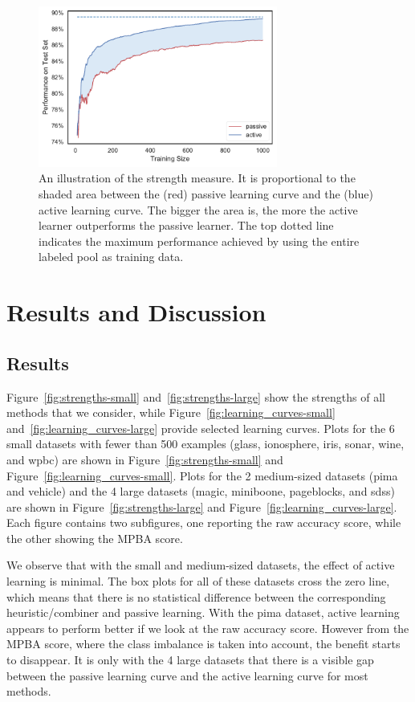\documentclass[fleqn,10pt,lineno]{wlpeerj} %
\begin{document}
\begin{figure}[htbp]
	\centering
	\includegraphics[width=0.7\textwidth]{figures/strength}
	\caption[Strength Measure]{An illustration of the strength measure. It is
	proportional to the shaded area between the (red) passive learning curve
	and the (blue) active learning curve. The bigger the area is, the more the
	active learner outperforms the passive learner. The top dotted line
	indicates the maximum performance achieved by using the entire labeled
	pool as training data.}
	\label{fig:strength}
\end{figure}

\section{Results and Discussion}\label{sec:discuss}

\subsection{Results}

Figure~\ref{fig:strengths-small} and~\ref{fig:strengths-large} show the
strengths of all methods that we consider, while
Figure~\ref{fig:learning_curves-small} and~\ref{fig:learning_curves-large}
provide selected learning curves. Plots for the 6 small datasets with fewer
than 500 examples (glass, ionosphere, iris, sonar, wine, and wpbc) are shown in
Figure~\ref{fig:strengths-small} and Figure~\ref{fig:learning_curves-small}.
Plots for the 2 medium-sized datasets (pima and vehicle) and the 4 large
datasets (magic, miniboone, pageblocks, and sdss) are shown in
Figure~\ref{fig:strengths-large} and Figure~\ref{fig:learning_curves-large}.
Each figure contains two subfigures, one reporting the raw accuracy score,
while the other showing the MPBA score.

We observe that with the small and medium-sized datasets, the effect of active
learning is minimal. The box plots for all of these datasets cross the zero
line, which means that there is no statistical difference between the
corresponding heuristic/combiner and passive learning. With the pima dataset,
active learning appears to perform better if we look at the raw accuracy score.
However from the MPBA score, where the class imbalance is taken into account,
the benefit starts to disappear. It is only with the 4 large datasets that
there is a visible gap between the passive learning curve and the active
learning curve for most methods.
\end{document}
